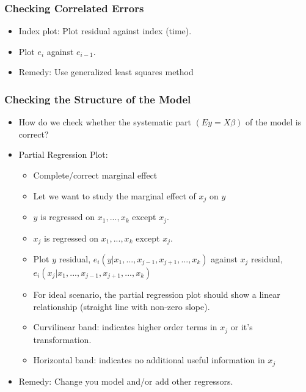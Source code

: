 \documentclass[10pt]{beamer} %
\begin{document}
\begin{frame}
   \frametitle{Checking Correlated Errors}
   \begin{itemize}
      \item Index plot: Plot residual against index (time).
      \item Plot $e_i$ against $e_{i-1}$.
      \item Remedy: Use generalized least squares method
   \end{itemize}
\end{frame}

\begin{frame}
   \frametitle{Checking the Structure of the Model}
   \begin{itemize}
      \item How do we check whether the systematic part $(Ey=X\beta)$ of the model is correct?
      \item Partial Regression Plot:
         \begin{itemize}
            \item Complete/correct marginal effect
            \item Let we want to study the marginal effect of $x_j$ on $y$
            \item $y$ is regressed on $x_1,...,x_k$ except $x_j$.
            \item $x_j$ is regressed on $x_1,...,x_k$ except $x_j$.
            \item Plot $y$ residual, $e_i(y|x_1,...,x_{j-1},x_{j+1},...,x_k)$
               against $x_j$ residual, $e_i(x_j|x_1,...,x_{j-1},x_{j+1},...,x_k)$
            \item For ideal scenario, the partial regression plot should show a
               linear relationship (straight line with non-zero slope). 
            \item Curvilinear band: indicates higher order terms in $x_j$ or it's transformation. 
            \item Horizontal band: indicates no additional useful information in $x_j$
         \end{itemize}
      \item Remedy: Change you model and/or add other regressors.
   \end{itemize}
\end{frame}
\end{document}
